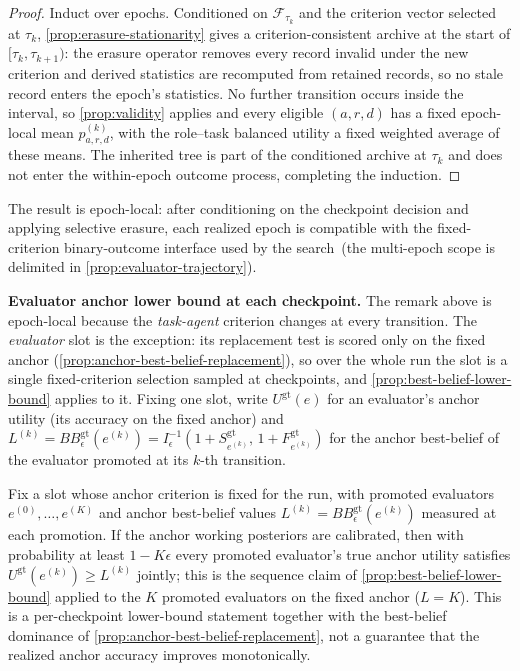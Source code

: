 \begin{proof}
Induct over epochs. Conditioned on \(\mathcal F_{\tau_k}\) and the criterion vector selected at \(\tau_k\), \cref{prop:erasure-stationarity} gives a criterion-consistent archive at the start of \([\tau_k,\tau_{k+1})\): the erasure operator removes every record invalid under the new criterion and derived statistics are recomputed from retained records, so no stale record enters the epoch's statistics. No further transition occurs inside the interval, so \cref{prop:validity} applies and every eligible \((a,r,d)\) has a fixed epoch-local mean \(p_{a,r,d}^{(k)}\), with the role--task balanced utility a fixed weighted average of these means. The inherited tree is part of the conditioned archive at \(\tau_k\) and does not enter the within-epoch outcome process, completing the induction.
\end{proof}

\begin{remark}
The result is epoch-local: after conditioning on the checkpoint decision and applying selective erasure, each realized epoch is compatible with the fixed-criterion binary-outcome interface used by the \hgm search~(the multi-epoch scope is delimited in \cref{prop:evaluator-trajectory}).
\end{remark}

\noindent\textbf{Evaluator anchor lower bound at each checkpoint.}
The remark above is epoch-local because the \emph{task-agent} criterion changes at every transition. The \emph{evaluator} slot is the exception: its replacement test is scored only on the fixed anchor (\cref{prop:anchor-best-belief-replacement}), so over the whole run the slot is a single fixed-criterion selection sampled at checkpoints, and \cref{prop:best-belief-lower-bound} applies to it. Fixing one slot, write \(U^{\mathrm{gt}}(e)\) for an evaluator's anchor utility (its accuracy on the fixed anchor) and \(L^{(k)}=BB_\epsilon^{\mathrm{gt}}(e^{(k)})=I^{-1}_\epsilon(1+S^{\mathrm{gt}}_{e^{(k)}},\,1+F^{\mathrm{gt}}_{e^{(k)}})\) for the anchor best-belief of the evaluator promoted at its \(k\)-th transition.

\begin{remark}
\label{prop:evaluator-trajectory}
Fix a slot whose anchor criterion is fixed for the run, with promoted evaluators \(e^{(0)},\dots,e^{(K)}\) and anchor best-belief values \(L^{(k)}=BB_\epsilon^{\mathrm{gt}}(e^{(k)})\) measured at each promotion. If the anchor working posteriors are calibrated, then with probability at least \(1-K\epsilon\) every promoted evaluator's true anchor utility satisfies \(U^{\mathrm{gt}}(e^{(k)})\ge L^{(k)}\) jointly; this is the sequence claim of \cref{prop:best-belief-lower-bound} applied to the \(K\) promoted evaluators on the fixed anchor (\(L=K\)). This is a per-checkpoint lower-bound statement together with the best-belief dominance of \cref{prop:anchor-best-belief-replacement}, not a guarantee that the realized anchor accuracy improves monotonically.
\end{remark}

